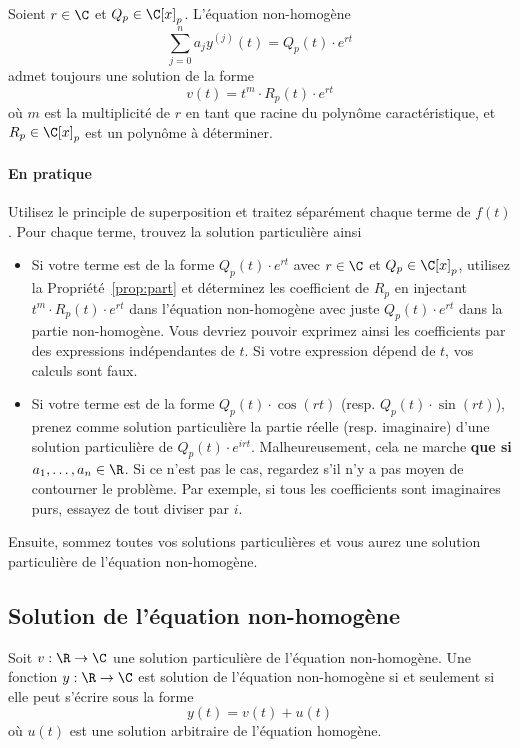 \begin{myprop}
	\label{prop:part}
	Soient $r \in \C$ et $Q_p \in \C[x]_p$.
	L'équation non-homogène
	\[ \sum_{j=0}^n a_j y^{(j)}(t) = Q_p(t) \cdot e^{rt} \]
	admet toujours une solution de la forme
	\[ v(t) = t^m \cdot R_p(t) \cdot e^{rt} \]
	où $m$ est la multiplicité de $r$ en tant que racine du polynôme caractéristique,
	et $R_p \in \C[x]_p$ est un polynôme à déterminer.
\end{myprop}

\paragraph{En pratique}
Utilisez le principle de superposition et traitez séparément chaque terme de $f(t)$.
Pour chaque terme, trouvez la solution particulière ainsi
\begin{itemize}
	\item Si votre terme est de la forme $Q_p(t) \cdot e^{rt}$ avec $r \in \C$ et $Q_p \in \C[x]_p$,
		utilisez la Propriété~\ref{prop:part} et déterminez les coefficient de $R_p$ en injectant
		$t^m \cdot R_p(t) \cdot e^{rt}$ dans l'équation non-homogène avec juste $Q_p(t) \cdot e^{rt}$
		dans la partie non-homogène.
		Vous devriez pouvoir exprimez ainsi les coefficients par des expressions indépendantes de $t$.
		Si votre expression dépend de $t$, vos calculs sont faux.
	\item Si votre terme est de la forme $Q_p(t) \cdot \cos(rt)$ (resp. $Q_p(t) \cdot \sin(rt)$),
		prenez comme solution particulière la partie réelle (resp. imaginaire) d'une solution particulière de
		$Q_p(t) \cdot e^{irt}$.
		Malheureusement, cela ne marche \textbf{que si $a_1, \dots, a_n \in \R$}.
		Si ce n'est pas le cas, regardez s'il n'y a pas moyen de contourner le problème.
		Par exemple, si tous les coefficients sont imaginaires purs, essayez de tout diviser par $i$.
\end{itemize}
Ensuite, sommez toutes vos solutions particulières et vous aurez une solution particulière de l'équation non-homogène.

\subsection{Solution de l'équation non-homogène}
\begin{mytheo}
	Soit $v: \R \to \C$ une solution particulière de l'équation non-homogène.
	Une fonction $y: \R \to \C$ est solution de l'équation non-homogène si et seulement si elle peut s'écrire sous la forme
	\[ y(t) = v(t) + u(t) \]
	où $u(t)$ est une solution arbitraire de l'équation homogène.
\end{mytheo}

